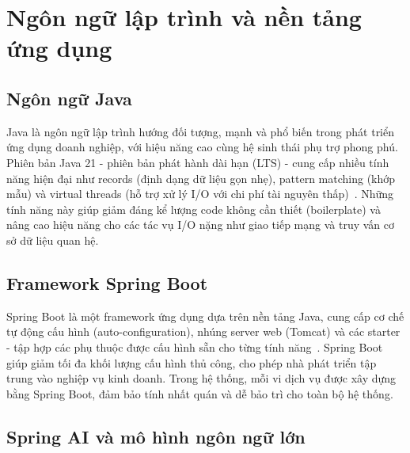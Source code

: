 \documentclass[../BTL.tex]{subfiles}
\begin{document}
\section{Ngôn ngữ lập trình và nền tảng ứng dụng}
\label{section:1.3}

\subsection{Ngôn ngữ Java}
\label{section:1.3.1}

Java là ngôn ngữ lập trình hướng đối tượng, mạnh và phổ biến trong phát triển ứng dụng doanh nghiệp, với hiệu năng cao cùng hệ sinh thái phụ trợ phong phú. Phiên bản Java 21 - phiên bản phát hành dài hạn (LTS) - cung cấp nhiều tính năng hiện đại như records (định dạng dữ liệu gọn nhẹ), pattern matching (khớp mẫu) và virtual threads (hỗ trợ xử lý I/O với chi phí tài nguyên thấp)~\cite{oracle2023java21}. Những tính năng này giúp giảm đáng kể lượng code không cần thiết (boilerplate) và nâng cao hiệu năng cho các tác vụ I/O nặng như giao tiếp mạng và truy vấn cơ sở dữ liệu quan hệ.

\subsection{Framework Spring Boot}
\label{section:1.3.2}

Spring Boot là một framework ứng dụng dựa trên nền tảng Java, cung cấp cơ chế tự động cấu hình (auto-configuration), nhúng server web (Tomcat) và các starter - tập hợp các phụ thuộc được cấu hình sẵn cho từng tính năng~\cite{springbootdocs}. Spring Boot giúp giảm tối đa khối lượng cấu hình thủ công, cho phép nhà phát triển tập trung vào nghiệp vụ kinh doanh. Trong hệ thống, mỗi vi dịch vụ được xây dựng bằng Spring Boot, đảm bảo tính nhất quán và dễ bảo trì cho toàn bộ hệ thống.

\subsection{Spring AI và mô hình ngôn ngữ lớn}
\label{section:1.3.3}
\end{document}

